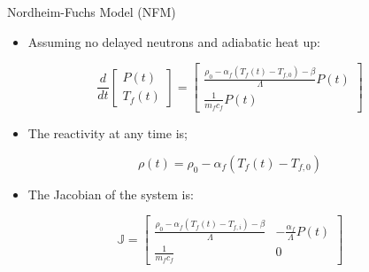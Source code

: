 \documentclass[serif]{beamer}
\begin{document}
\begin{frame}{Nordheim-Fuchs Model (NFM)}
  \begin{itemize}
    \item Assuming no delayed neutrons and adiabatic heat up:
  \end{itemize}
  \begin{equation}
    \nonumber
    \frac{d}{dt}\left[\begin{array}{c}
                        P\left(t\right) \\
                        T_f\left(t\right)
                      \end{array}\right] =
                \left[\begin{array}{c}
                        \frac{\rho_0 - \alpha_f\left(T_f\left(t\right) - T_{f,0}\right) - \beta}{\Lambda}P\left(t\right) \\
                        \frac{1}{m_fc_f}P\left(t\right)
                      \end{array}\right]
  \end{equation}
  \begin{itemize}
   \item The reactivity at any time is;
  \end{itemize}
  \begin{equation}
    \nonumber
    \rho\left(t\right) = \rho_0 - \alpha_f\left(T_f\left(t\right) - T_{f,0}\right)
  \end{equation}
  \begin{itemize}
   \item The Jacobian of the system is:
  \end{itemize}
  \begin{equation}
    \nonumber
    \mathbb{J} = \left[\begin{array}{cc}
                         \frac{\rho_0 - \alpha_f\left(T_f\left(t\right) - T_{f,i}\right) - \beta}{\Lambda} & -\frac{\alpha_f}{\Lambda}P\left(t\right) \\
                         \frac{1}{m_fc_f} & 0
                       \end{array}\right]
  \end{equation}
\end{frame}
\end{document}
